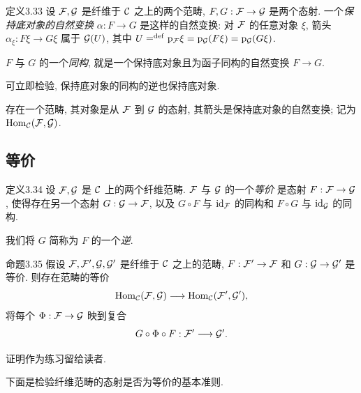 \begin{origstatement}{定义}{3.33}\label{ch03:def333}
设 $\mathcal F,\mathcal G$ 是纤维于 $\mathcal C$ 之上的两个范畴, $F,G:\mathcal F\to\mathcal G$ 是两个态射. 一个\emph{保持底对象的自然变换} $\alpha:F\to G$ 是这样的自然变换: 对 $\mathcal F$ 的任意对象 $\xi$, 箭头 $\alpha_\xi:F\xi\to G\xi$ 属于 $\mathcal G(U)$, 其中 $U\mathrel{\mathop=^{\mathrm{def}}}\mathrm p_{\mathcal F}\xi=\mathrm p_{\mathcal G}(F\xi)=\mathrm p_{\mathcal G}(G\xi)$.

$F$ 与 $G$ 的一个\emph{同构}, 就是一个保持底对象且为函子同构的自然变换 $F\to G$.
\end{origstatement}

可立即检验, 保持底对象的同构的逆也保持底对象.

存在一个范畴, 其对象是从 $\mathcal F$ 到 $\mathcal G$ 的态射, 其箭头是保持底对象的自然变换; 记为 $\operatorname{Hom}_{\mathcal C}(\mathcal F,\mathcal G)$.

\subsection{等价}
\begin{origstatement}{定义}{3.34}\label{ch03:def334}
设 $\mathcal F,\mathcal G$ 是 $\mathcal C$ 上的两个纤维范畴. $\mathcal F$ 与 $\mathcal G$ 的一个\emph{等价} 是态射 $F:\mathcal F\to\mathcal G$, 使得存在另一个态射 $G:\mathcal G\to\mathcal F$, 以及 $G\circ F$ 与 $\mathrm{id}_{\mathcal F}$ 的同构和 $F\circ G$ 与 $\mathrm{id}_{\mathcal G}$ 的同构.

我们将 $G$ 简称为 $F$ 的一个\emph{逆}.
\end{origstatement}

\begin{origstatement}{命题}{3.35}\label{ch03:prop335}
假设 $\mathcal F,\mathcal F',\mathcal G,\mathcal G'$ 是纤维于 $\mathcal C$ 之上的范畴, $F:\mathcal F'\to\mathcal F$ 和 $G:\mathcal G\to\mathcal G'$ 是等价. 则存在范畴的等价
\[
\operatorname{Hom}_{\mathcal C}(\mathcal F,\mathcal G)\longrightarrow\operatorname{Hom}_{\mathcal C}(\mathcal F',\mathcal G'),
\]
将每个 $\Phi:\mathcal F\to\mathcal G$ 映到复合
\[
G\circ\Phi\circ F:\mathcal F'\longrightarrow\mathcal G'.
\]
\end{origstatement}

证明作为练习留给读者.

下面是检验纤维范畴的态射是否为等价的基本准则.

